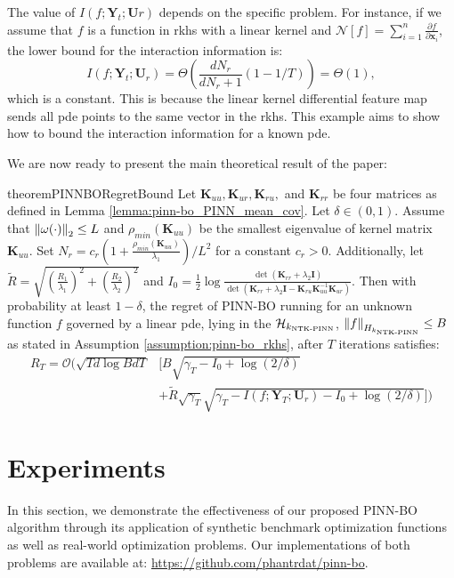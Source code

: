 \begin{remark}
The value of $I(f; \mathbf{Y}_t; \mathbf{U}r)$ depends on the specific problem. For instance, if we assume that $f$ is a function in \ac{rkhs} with a linear kernel and $\mathcal{N}[f]= \sum_{i=1}^n \frac{\partial f}{\partial \mathbf{x}_i}$, the lower bound for the interaction information is: \[
I(f; \mathbf{Y}_t; \mathbf{U}_r) = \Theta\left(\frac{d N_r}{d N_r+1}(1-1/T)\right) = \Theta(1),
\] 
which is a constant. This is because the linear kernel differential feature map sends all \ac{pde} points to the same vector in the \ac{rkhs}. This example aims to show how to bound the interaction information for a known \ac{pde}. 
\end{remark}
We are now ready to present the main theoretical result of the paper: 
\begin{restatable}{theorem}{PINNBORegretBound}
\label{theorem:pinn-bo_regret_bound}
Let $\mathbf{K}_{uu}, \mathbf{K}_{ur}, \mathbf{K}_{ru},$ and $\mathbf{K}_{rr}$ be four matrices as defined in Lemma \ref{lemma:pinn-bo_PINN_mean_cov}. 
Let $\delta \in (0,1)$. Assume that $\norm{\omega(\cdot)}_2 \le L$ and  $\rho_{min}(\mathbf{K}_{uu})$ be the smallest eigenvalue of kernel matrix $\mathbf{K}_{uu}$. Set $N_r = c_r\left(1+ \frac{\rho_{min}(\mathbf{K}_{uu})}{\lambda_1}\right)/L^2$ for a constant $c_r > 0$. Additionally,  let $\widetilde{R} = \sqrt{\left(\frac{R_1}{\lambda_1}\right)^2 + \left(\frac{R_2}{\lambda_2}\right)^2}$ and $I_0 = \frac{1}{2}\log \frac{\det(\mathbf{K}_{rr} + \lambda_2\mathbf{I})}{\det(\mathbf{K}_{rr} + \lambda_2\mathbf{I} - \mathbf{K}_{ru} \mathbf{K}_{uu}^{-1} \mathbf{K}_{ur})}$. Then with probability at least $1-\delta$, the regret of PINN-BO running for an unknown function $f$ governed by a linear \ac{pde}, lying in the $\mathcal{H}_{k_\textup{NTK-PINN}}$, $\norm{f}_{{H}_{k_\textup{NTK-PINN}}} \le B$ as stated in Assumption \ref{assumption:pinn-bo_rkhs}, after $T$ iterations satisfies:
\begin{equation*}
    \begin{aligned}
        R_T  = \mathcal{O} \Bigg(\sqrt{T d\log BdT} &\bigg[B \sqrt{\gamma_T - I_0 + \log(2/\delta)} 
        \\
        & + \widetilde{R} \sqrt{\gamma_T} \sqrt{\gamma_T - I (f; \mathbf{Y}_T; \mathbf{U}_r) - I_0 + \log(2/\delta
        )} \bigg] \Bigg)
    \end{aligned}
\end{equation*}
\end{restatable}


\section{Experiments}
\label{section:pinn-bo_experiments}
In this section, we demonstrate the effectiveness of our proposed PINN-BO algorithm through its application of synthetic benchmark optimization functions as well as real-world optimization problems. Our implementations of both problems are available at: \url{https://github.com/phantrdat/pinn-bo}.  

